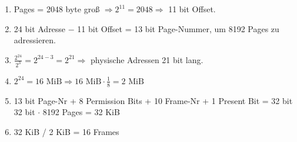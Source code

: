 \documentclass[a4paper, 12pt, margins=2cm]{homework}
\begin{document}
  \begin{problem}
  \end{problem}
  \begin{solution} \hfill
    \begin{enumerate}[label=(\alph*)]\itemsep0pt
      \item Pages = 2048 byte groß $\Longrightarrow 2^{11} = 2048 \Longrightarrow$ 11 bit Offset.
      \item 24 bit Adresse $-$ 11 bit Offset = 13 bit Page-Nummer, um 8192 Pages zu adressieren.
      \item $\frac{2^{24}}{2^{3}} = 2^{24-3} = 2^{21} \Longrightarrow$ physische Adressen 21 bit lang.
      \item $2^{24} = 16 \text{ MiB} \Longrightarrow 16 \text{ MiB}\cdot \frac{1}{8} = 2\text{ MiB}$
      \item 13 bit Page-Nr + 8 Permission Bits + 10 Frame-Nr + 1 Present Bit = 32 bit \\
            32 bit $\cdot$ 8192 Pages = 32 KiB
      \item 32 KiB / 2 KiB = 16 Frames
    \end{enumerate}
  \end{solution}
\end{document}
